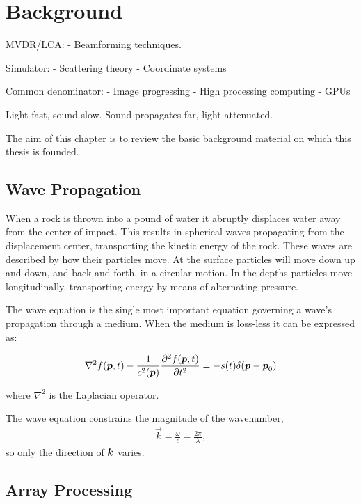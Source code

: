 \chapter{Background}

MVDR/LCA:
- Beamforming techniques.

Simulator:
- Scattering theory
- Coordinate systems

Common denominator:
- Image progressing
- High processing computing
- GPUs


Light fast, sound slow.
Sound propagates far, light attenuated.

The aim of this chapter is to review the basic background material on which this thesis is founded.

\section{Wave Propagation}

When a rock is thrown into a pound of water it abruptly displaces water away from the center of impact. 
This results in spherical waves propagating from the displacement center, transporting the kinetic energy of the rock. These waves are described by how their particles move. At the surface particles will move down up and down, and back and forth, in a circular motion. In the depths particles move longitudinally, transporting energy by means of alternating pressure.

The wave equation is the single most important equation governing a wave's propagation through a medium. When the medium is loss-less it can be expressed as:

\begin{align*}
\nabla^2 f(\boldsymbol{p},t) - \frac{1}{c^2(\boldsymbol{p})}\frac{\partial^2 f(\boldsymbol{p},t)}{\partial t^2} = -s(t) \delta(\boldsymbol{p}-\boldsymbol{p}_0)
\end{align*}

where $\nabla^2$ is the Laplacian operator.


The wave equation constrains the magnitude of the wavenumber,
%
\begin{align*}
\vec k = \frac{\omega}{c} = \frac{2\pi}{\lambda},
\end{align*}
%
so only the direction of $\boldsymbol{k}$ varies.

\section{Array Processing}

